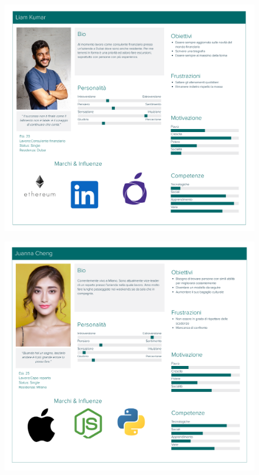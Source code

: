 \documentclass{natourDoc}
\begin{document}
\begin{figure}[!htbp]
	\centering
	\includegraphics[width=\textwidth]{./personas/personas-kumar.pdf}
\end{figure}

\begin{figure}[!htbp]
	\centering
	\includegraphics[width=\textwidth]{./personas/personas-cheng.pdf}
\end{figure}
\end{document}
